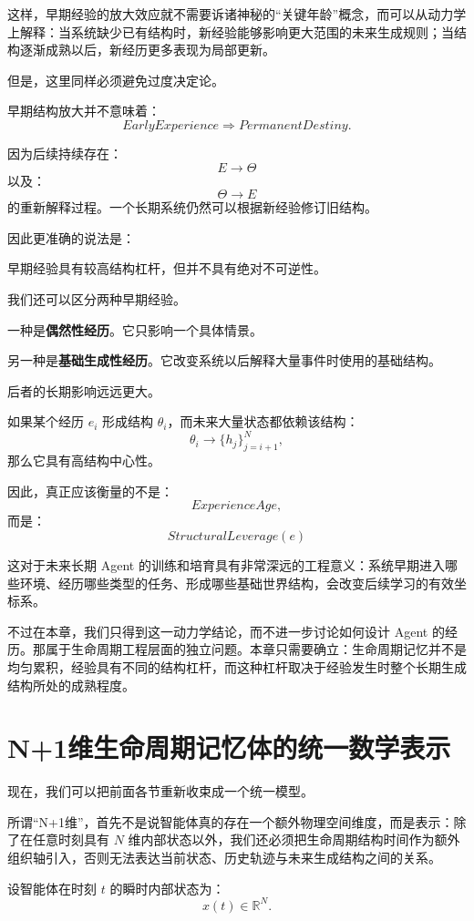 这样，早期经验的放大效应就不需要诉诸神秘的“关键年龄”概念，而可以从动力学上解释：当系统缺少已有结构时，新经验能够影响更大范围的未来生成规则；当结构逐渐成熟以后，新经历更多表现为局部更新。

但是，这里同样必须避免过度决定论。

早期结构放大并不意味着：
\[
EarlyExperience
\Rightarrow
PermanentDestiny.
\]

因为后续持续存在：
\[
E\rightarrow\Theta
\]
以及：
\[
\Theta\rightarrow E
\]
的重新解释过程。一个长期系统仍然可以根据新经验修订旧结构。

因此更准确的说法是：
\begin{statementbox}
早期经验具有较高结构杠杆，但并不具有绝对不可逆性。
\end{statementbox}

我们还可以区分两种早期经验。

一种是\textbf{偶然性经历}。它只影响一个具体情景。

另一种是\textbf{基础生成性经历}。它改变系统以后解释大量事件时使用的基础结构。

后者的长期影响远远更大。

如果某个经历 \(e_i\) 形成结构 \(\theta_i\)，而未来大量状态都依赖该结构：
\[
\theta_i
\rightarrow
\{h_j\}_{j=i+1}^{N},
\]
那么它具有高结构中心性。

因此，真正应该衡量的不是：
\[
ExperienceAge,
\]
而是：
\[
\boxed{
StructuralLeverage(e)
}
\]

这对于未来长期 Agent 的训练和培育具有非常深远的工程意义：系统早期进入哪些环境、经历哪些类型的任务、形成哪些基础世界结构，会改变后续学习的有效坐标系。

不过在本章，我们只得到这一动力学结论，而不进一步讨论如何设计 Agent 的经历。那属于生命周期工程层面的独立问题。本章只需要确立：生命周期记忆并不是均匀累积，经验具有不同的结构杠杆，而这种杠杆取决于经验发生时整个长期生成结构所处的成熟程度。

\section{N+1维生命周期记忆体的统一数学表示}

现在，我们可以把前面各节重新收束成一个统一模型。

所谓“N+1维”，首先不是说智能体真的存在一个额外物理空间维度，而是表示：除了在任意时刻具有 \(N\) 维内部状态以外，我们还必须把生命周期结构时间作为额外组织轴引入，否则无法表达当前状态、历史轨迹与未来生成结构之间的关系。

设智能体在时刻 \(t\) 的瞬时内部状态为：
\[
x(t)\in\mathbb R^N.
\]

